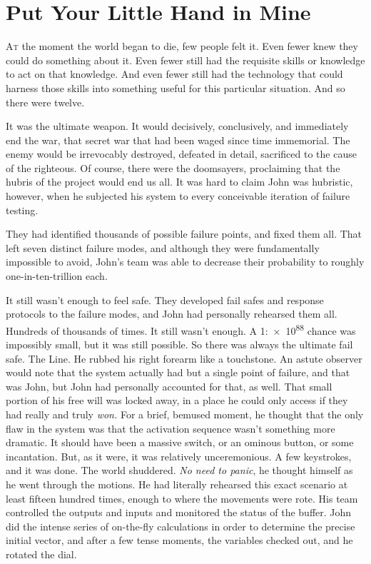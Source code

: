 \chapter{Put Your Little Hand in Mine}


\lettrine{A}{t} the moment the world began to die, few people felt it.
\SmallVSpace
Even fewer knew they could do something about it.
\SmallVSpace
Even fewer still had the requisite skills or knowledge to act on that knowledge.
\SmallVSpace
And even fewer still had the technology that could harness those skills into something useful for this particular situation.
\SomeVSpace
And so{\el} there were twelve.
\simpleline
{}

It was the ultimate weapon.
\SomeVSpace
It would decisively, conclusively, and immediately end the war, that secret war that had been waged since time immemorial. The enemy would be irrevocably destroyed, defeated in detail, sacrificed to the cause of the righteous. Of course, there were the doomsayers, proclaiming that the hubris of the project would end us all. It was hard to claim John was hubristic, however, when he subjected his system to every conceivable iteration of failure testing.

They had identified thousands of possible failure points, and fixed them all. That left seven distinct failure modes, and although they were fundamentally impossible to avoid, John’s team was able to decrease their probability to roughly one-in-ten-trillion each.

It still wasn’t enough to feel safe. They developed fail safes and response protocols to the failure modes, and John had personally rehearsed them all. Hundreds of thousands of times.
\SomeVSpace
It still wasn’t enough.
\SomeVSpace
A 1:\num{e88} chance was impossibly small, but it was still possible. So there was always the ultimate fail safe. The Line. He rubbed his right forearm like a touchstone. An astute observer would note that the system actually had but a single point of failure, and that was John, but John had personally accounted for that, as well. That small portion of his free will was locked away, in a place he could only access if they had really and truly \emph{won.}
\SomeVSpace
For a brief, bemused moment, he thought that the only flaw in the system was that the activation sequence wasn’t something more dramatic. It should have been a massive switch, or an ominous button, or some incantation. But, as it were, it was relatively unceremonious. A few keystrokes, and it was done.
\simpleline
The world shuddered.
\simpleline
\emph{No need to panic}, he thought himself as he went through the motions. He had literally rehearsed this exact scenario at least fifteen hundred times, enough to where the movements were rote. His team controlled the outputs and inputs and monitored the status of the buffer. John did the intense series of on-the-fly calculations in order to determine the precise initial vector, and after a few tense moments, the variables checked out, and he rotated the dial.

